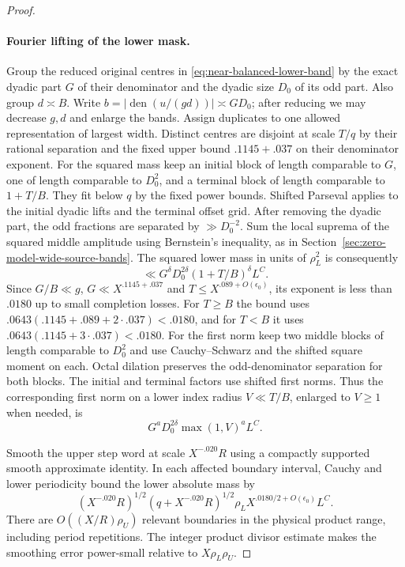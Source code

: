 \documentclass[11pt,a4paper]{article}
\theoremstyle{paperplain}
\numberwithin{equation}{section}
\begin{document}
\begin{proof}
\paragraph{Fourier lifting of the lower mask.}
Group the reduced original centres in \eqref{eq:near-balanced-lower-band}
by the exact dyadic part $G$ of their denominator and the
dyadic size $D_0$ of its odd part. Also group $d\asymp B$.
Write $b=|\operatorname{den}(u/(gd))|\asymp GD_0$;
after reducing we may decrease $g,d$ and enlarge the bands.
Assign duplicates to one allowed representation of largest
width. Distinct centres are disjoint at scale $T/q$ by their
rational separation and the fixed upper bound $.1145+.037$
on their denominator exponent. For the squared mass keep an initial
block of length comparable to $G$, one of length comparable to $D_0^2$,
and a terminal block of length comparable to $1+T/B$. They fit below
$q$ by the fixed power bounds. Shifted Parseval applies to the initial
dyadic lifts and the terminal offset grid. After removing the dyadic
part, the odd fractions are separated by $\gg D_0^{-2}$. Sum the local
suprema of the squared middle amplitude using Bernstein's inequality,
as in Section~\ref{sec:zero-model-wide-source-bands}. The squared lower
mass in units of $\rho_L^2$ is consequently
\[
                  \ll G^\delta D_0^{2\delta}(1+T/B)^\delta L^C.
\]
Since $G/B\ll g$, $G\ll X^{.1145+.037}$ and
$T\le X^{.089+O(\epsilon_0)}$, its exponent is less than $.0180$
up to small completion losses. For $T\ge B$ the bound uses
$.0643(.1145+.089+2\cdot.037)<.0180$, and for $T<B$ it uses
$.0643(.1145+3\cdot.037)<.0180$.
For the first norm keep two middle blocks of length comparable
to $D_0^2$ and use Cauchy--Schwarz and the shifted square moment on
each. Octal dilation preserves the odd-denominator separation for
both blocks. The initial and terminal factors use shifted first norms. Thus the corresponding
first norm on a lower index radius $V\ll T/B$, enlarged to
$V\ge1$ when needed, is
\begin{equation}\label{eq:near-balanced-band-first-norm}
           G^a D_0^{2\delta} \max(1,V)^a L^C .
\end{equation}

Smooth the upper step word at scale $X^{-.020}R$ using
a compactly supported smooth approximate identity. In each
affected boundary interval, Cauchy and lower periodicity
bound the lower absolute mass by
\[
 (X^{-.020}R)^{1/2}(q+X^{-.020}R)^{1/2}
                       \rho_L X^{.0180/2+O(\epsilon_0)}L^C .
\]
There are $O((X/R)\rho_U)$ relevant boundaries in the
physical product range, including period repetitions.
The integer product divisor estimate makes the smoothing
error power-small relative to $X\rho_L\rho_U$.


\end{proof}
\end{document}
